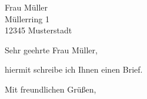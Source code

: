 \documentclass[fromemail=true,fromphone=true]{scrlttr2}
\begin{document}
\begin{letter}{Frau Müller\\ Müllerring 1 \\ 12345 Musterstadt}
\opening{Sehr geehrte Frau Müller,}
 
hiermit schreibe ich Ihnen einen Brief.

\closing{Mit freundlichen Grüßen,}
 
\end{letter}
\end{document}
